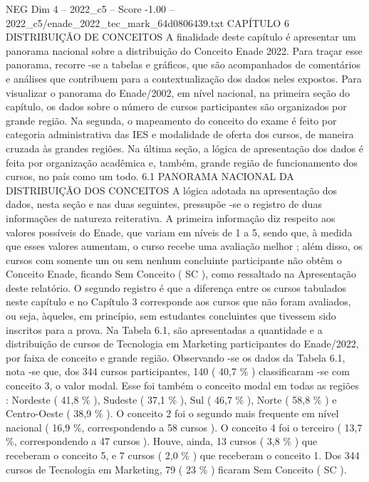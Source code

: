\begin{textsample}{NEG Dim 4 – 2022\_c5 – Score -1.00 – 2022\_c5/enade\_2022\_tec\_mark\_64d0806439.txt}  \label{ex:f4_neg_078}
CAPÍTULO 6 DISTRIBUIÇÃO DE CONCEITOS A finalidade deste capítulo é apresentar um panorama nacional sobre a distribuição do Conceito Enade 2022.
Para traçar esse panorama, recorre -se a tabelas e gráficos, que são acompanhados de comentários e análises que contribuem para a contextualização dos dados neles expostos.
Para visualizar o panorama do Enade/2002, em nível nacional, na primeira seção do capítulo, os dados sobre o número de cursos participantes são organizados por grande região.
Na segunda, o mapeamento do conceito do exame é feito por categoria administrativa das IES e modalidade de oferta dos cursos, de maneira cruzada às grandes regiões.
Na última seção, a lógica de apresentação dos dados é feita por organização acadêmica e, também, grande região de funcionamento dos cursos, no país como um todo. 6.1 PANORAMA NACIONAL DA DISTRIBUIÇÃO DOS CONCEITOS A lógica adotada na apresentação dos dados, nesta seção e nas duas seguintes, pressupõe -se o registro de duas informações de natureza reiterativa.
A primeira informação diz respeito aos valores possíveis do Enade, que variam em níveis de 1 a 5, sendo que, à medida que esses valores aumentam, o curso recebe uma avaliação melhor ; além disso, os cursos com somente um ou sem nenhum concluinte participante não obtêm o Conceito Enade, ficando Sem Conceito ( SC ), como ressaltado na Apresentação deste relatório.
O segundo registro é que a diferença entre os cursos tabulados neste capítulo e no Capítulo 3 corresponde aos cursos que não foram avaliados, ou seja, àqueles, em princípio, sem estudantes concluintes que tivessem sido inscritos para a prova.
Na Tabela 6.1, são apresentadas a quantidade e a distribuição de cursos de Tecnologia em Marketing participantes do Enade/2022, por faixa de conceito e grande região.
Observando -se os dados da Tabela 6.1, nota -se que, dos 344 cursos participantes, 140 ( 40,7 \% ) classificaram -se com conceito 3, o valor modal.
Esse foi também o conceito modal em todas as regiões : Nordeste ( 41,8 \% ), Sudeste ( 37,1 \% ), Sul ( 46,7 \% ), Norte ( 58,8 \% ) e Centro-Oeste ( 38,9 \% ).
O conceito 2 foi o segundo mais frequente em nível nacional ( 16,9 \%, correspondendo a 58 cursos ).
O conceito 4 foi o terceiro ( 13,7 \%, correspondendo a 47 cursos ).
Houve, ainda, 13 cursos ( 3,8 \% ) que receberam o conceito 5, e 7 cursos ( 2,0 \% ) que receberam o conceito 1.
Dos 344 cursos de Tecnologia em Marketing, 79 ( 23 \% ) ficaram Sem Conceito ( SC ).

\end{textsample}
